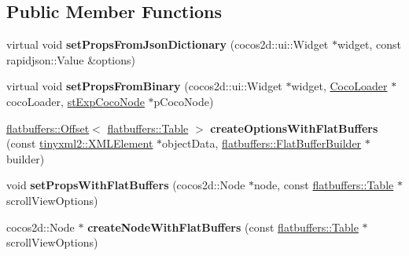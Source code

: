 \subsection*{Public Member Functions}
\begin{DoxyCompactItemize}
\item 
\mbox{\label{classcocostudio_1_1ScrollViewReader_a7bd07d4c27480476938e425860979a1d}} 
virtual void {\bfseries set\+Props\+From\+Json\+Dictionary} (cocos2d\+::ui\+::\+Widget $\ast$widget, const rapidjson\+::\+Value \&options)
\item 
\mbox{\label{classcocostudio_1_1ScrollViewReader_ac12c36c894c6a4533d2a8c285a573923}} 
virtual void {\bfseries set\+Props\+From\+Binary} (cocos2d\+::ui\+::\+Widget $\ast$widget, \hyperlink{classcocostudio_1_1CocoLoader}{Coco\+Loader} $\ast$coco\+Loader, \hyperlink{structcocostudio_1_1stExpCocoNode}{st\+Exp\+Coco\+Node} $\ast$p\+Coco\+Node)
\item 
\mbox{\label{classcocostudio_1_1ScrollViewReader_aca16be2d5dcb851571ce934370e02f11}} 
\hyperlink{structflatbuffers_1_1Offset}{flatbuffers\+::\+Offset}$<$ \hyperlink{classflatbuffers_1_1Table}{flatbuffers\+::\+Table} $>$ {\bfseries create\+Options\+With\+Flat\+Buffers} (const \hyperlink{classtinyxml2_1_1XMLElement}{tinyxml2\+::\+X\+M\+L\+Element} $\ast$object\+Data, \hyperlink{classflatbuffers_1_1FlatBufferBuilder}{flatbuffers\+::\+Flat\+Buffer\+Builder} $\ast$builder)
\item 
\mbox{\label{classcocostudio_1_1ScrollViewReader_a9b510f16bb5621cd7eea4e51cfeac8f3}} 
void {\bfseries set\+Props\+With\+Flat\+Buffers} (cocos2d\+::\+Node $\ast$node, const \hyperlink{classflatbuffers_1_1Table}{flatbuffers\+::\+Table} $\ast$scroll\+View\+Options)
\item 
\mbox{\label{classcocostudio_1_1ScrollViewReader_afba600b89401c48ff0228ca4e452930e}} 
cocos2d\+::\+Node $\ast$ {\bfseries create\+Node\+With\+Flat\+Buffers} (const \hyperlink{classflatbuffers_1_1Table}{flatbuffers\+::\+Table} $\ast$scroll\+View\+Options)
\item 
\mbox{\label{classcocostudio_1_1ScrollViewReader_adb643e987ee5d83ca756fc3d8923a92a}} 

\end{DoxyCompactItemize}
